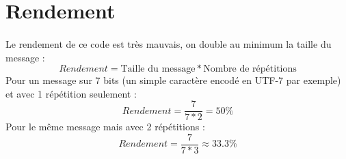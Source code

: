     \section{Rendement}

        \paragraph{}
Le rendement de ce code est très mauvais, on double au minimum la taille du message :
\[  Rendement = \text{Taille du message}*\text{Nombre de répétitions} \]
Pour un message sur 7 bits (un simple caractère encodé en UTF-7 par exemple) et avec 1 répétition seulement :
\[  Rendement = \frac{7}{7*2} = 50\% \]
Pour le même message mais avec 2 répétitions :
\[  Rendement = \frac{7}{7*3} \approx 33.3\% \]
